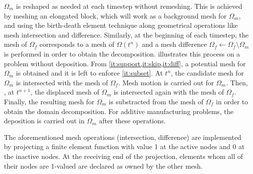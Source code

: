 $\Omega_m$ is reshaped as needed at each timestep
without remeshing. This is achieved by meshing an elongated block,
which will work as a background mesh for $\Omega_m$,
and using the birth-death element technique along geometrical
operations like mesh intersection and difference.
Similarly, at the beginning of each timestep, the mesh of $\Omega_f$ corresponds to
a mesh of $\Omega(t^n)$
and a mesh difference $\Omega_f \leftarrow \Omega_f \setminus \Omega_m$
is performed in order to obtain the decomposition.
 illustrates this process
on a problem without deposition.
From \cref{it:support,it:skip,it:diff}, a potential mesh for $\Omega_m$
is obtained and it is left to enforce \cref{it:subset}.
At $t^n$, the candidate mesh for $\Omega_m$
is intersected with the mesh
of $\Omega_f$.
Mesh motion is carried out for $\Omega_m$.
Then, , at $t^{n+1}$, the displaced mesh of $\Omega_m$
is intersected again with the mesh of $\Omega_f$.
Finally, the resulting mesh for $\Omega_m$
is substracted from the mesh of $\Omega_f$ in order to obtain
the domain decomposition.
For additive manufacturing problems, the deposition
is carried out in $\Omega_m$ after these operations.\par

The aforementioned mesh operations (intersection, difference)
are implemented by projecting a finite element function
with value 1 at the active nodes and 0 at the inactive nodes.
At the receiving end of the projection, elements whom all of their nodes
are 1-valued are declared as owned by the other mesh.\par

\iffalse
Show reference model
Go over limitations
Introduce my model
\fi
